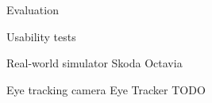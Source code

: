 \chap Evaluation

\sec Usability tests

\secc Real-world simulator Skoda Octavia

\secc Eye tracking camera Eye Tracker TODO

